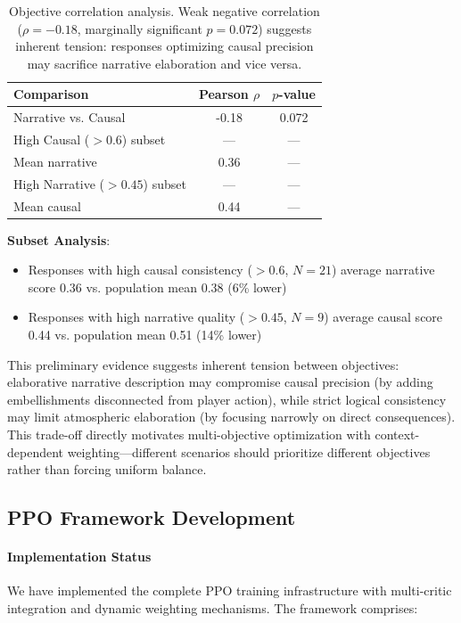 \documentclass[11pt]{article}
\begin{document}
\begin{table}[h]
\centering
\begin{tabular}{lcc}
\toprule
\textbf{Comparison} & \textbf{Pearson $\rho$} & \textbf{$p$-value} \\
\midrule
Narrative vs. Causal & -0.18 & 0.072 \\
High Causal ($>0.6$) subset & --- & --- \\
\quad Mean narrative & 0.36 & --- \\
High Narrative ($>0.45$) subset & --- & --- \\
\quad Mean causal & 0.44 & --- \\
\bottomrule
\end{tabular}
\caption{Objective correlation analysis. Weak negative correlation ($\rho = -0.18$, marginally significant $p=0.072$) suggests inherent tension: responses optimizing causal precision may sacrifice narrative elaboration and vice versa.}
\end{table}

\textbf{Subset Analysis}:
\begin{itemize}
    \item Responses with high causal consistency ($>0.6$, $N=21$) average narrative score 0.36 vs. population mean 0.38 (6\% lower)
    \item Responses with high narrative quality ($>0.45$, $N=9$) average causal score 0.44 vs. population mean 0.51 (14\% lower)
\end{itemize}

This preliminary evidence suggests inherent tension between objectives: elaborative narrative description may compromise causal precision (by adding embellishments disconnected from player action), while strict logical consistency may limit atmospheric elaboration (by focusing narrowly on direct consequences). This trade-off directly motivates multi-objective optimization with context-dependent weighting—different scenarios should prioritize different objectives rather than forcing uniform balance.


\subsection{PPO Framework Development}

\paragraph{Implementation Status}
We have implemented the complete PPO training infrastructure with multi-critic integration and dynamic weighting mechanisms. The framework comprises:
\end{document}
